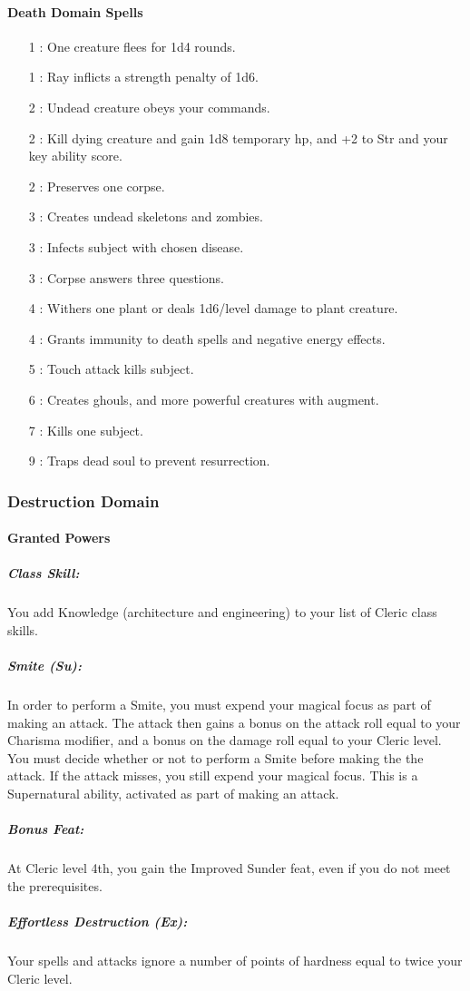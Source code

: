 \paragraph{Death Domain Spells}
\begin{itemize}
\item[1] : One creature flees for 1d4 rounds.
\item[1] : Ray inflicts a strength penalty of 1d6.
\item[2] : Undead creature obeys your commands.
\item[2] : Kill dying creature and gain 1d8 temporary hp, and +2 to Str and your key ability score.
\item[2] : Preserves one corpse.
\item[3] : Creates undead skeletons and zombies.
\item[3] : Infects subject with chosen disease.
\item[3] : Corpse answers three questions.
\item[4] : Withers one plant or deals 1d6/level damage to plant creature.
\item[4] : Grants immunity to death spells and negative energy effects.
\item[5] : Touch attack kills subject.
\item[6] : Creates ghouls, and more powerful creatures with augment.
\item[7] : Kills one subject.
\item[9] : Traps dead soul to prevent resurrection.
\end{itemize}
\subsubsection{Destruction Domain}
\paragraph{Granted Powers}
\subparagraph{Class Skill:} 
You add Knowledge (architecture and engineering) to your list of Cleric class skills.
\subparagraph{Smite (Su):}
In order to perform a Smite, you must expend your magical focus as part of making an attack.
The attack then gains a bonus on the attack roll equal to your Charisma modifier, and a bonus on the damage roll equal to your Cleric level.
You must decide whether or not to perform a Smite before making the the attack. 
If the attack misses, you still expend your magical focus.
This is a Supernatural ability, activated as part of making an attack.
\subparagraph{Bonus Feat:}
At Cleric level 4th, you gain the Improved Sunder feat, even if you do not meet the prerequisites.
\subparagraph{Effortless Destruction (Ex):}
Your spells and attacks ignore a number of points of hardness equal to twice your Cleric level.
